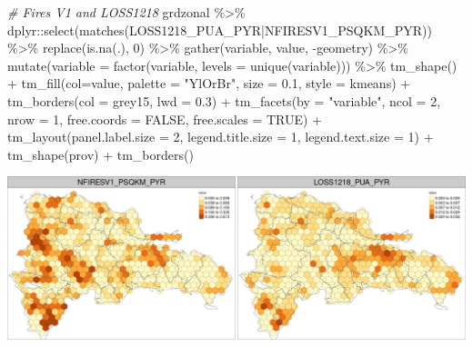 \documentclass[10pt,landscape,a3paper]{article}
\newenvironment{Shaded}{\begin{snugshade}}{\end{snugshade}}
\newcommand{\AttributeTok}[1]{\textcolor[rgb]{0.77,0.63,0.00}{#1}}
\newcommand{\CommentTok}[1]{\textcolor[rgb]{0.56,0.35,0.01}{\textit{#1}}}
\newcommand{\ConstantTok}[1]{\textcolor[rgb]{0.00,0.00,0.00}{#1}}
\newcommand{\DecValTok}[1]{\textcolor[rgb]{0.00,0.00,0.81}{#1}}
\newcommand{\FloatTok}[1]{\textcolor[rgb]{0.00,0.00,0.81}{#1}}
\newcommand{\FunctionTok}[1]{\textcolor[rgb]{0.00,0.00,0.00}{#1}}
\newcommand{\NormalTok}[1]{#1}
\newcommand{\SpecialCharTok}[1]{\textcolor[rgb]{0.00,0.00,0.00}{#1}}
\newcommand{\StringTok}[1]{\textcolor[rgb]{0.31,0.60,0.02}{#1}}
\begin{document}
\begin{Shaded}
\begin{Highlighting}[]

\CommentTok{\# Fires V1 and LOSS1218}
\NormalTok{grdzonal }\SpecialCharTok{\%\textgreater{}\%}\NormalTok{ dplyr}\SpecialCharTok{::}\FunctionTok{select}\NormalTok{(}\FunctionTok{matches}\NormalTok{(}\StringTok{\textquotesingle{}LOSS1218\_PUA\_PYR|NFIRESV1\_PSQKM\_PYR\textquotesingle{}}\NormalTok{)) }\SpecialCharTok{\%\textgreater{}\%} 
  \FunctionTok{replace}\NormalTok{(}\FunctionTok{is.na}\NormalTok{(.), }\DecValTok{0}\NormalTok{) }\SpecialCharTok{\%\textgreater{}\%} 
  \FunctionTok{gather}\NormalTok{(variable, value, }\SpecialCharTok{{-}}\NormalTok{geometry) }\SpecialCharTok{\%\textgreater{}\%}
  \FunctionTok{mutate}\NormalTok{(}\AttributeTok{variable =} \FunctionTok{factor}\NormalTok{(variable, }\AttributeTok{levels =} \FunctionTok{unique}\NormalTok{(variable))) }\SpecialCharTok{\%\textgreater{}\%} 
  \FunctionTok{tm\_shape}\NormalTok{() }\SpecialCharTok{+}
  \FunctionTok{tm\_fill}\NormalTok{(}\AttributeTok{col=}\StringTok{\textquotesingle{}value\textquotesingle{}}\NormalTok{, }\AttributeTok{palette =} \StringTok{"YlOrBr"}\NormalTok{, }\AttributeTok{size =} \FloatTok{0.1}\NormalTok{, }\AttributeTok{style =} \StringTok{\textquotesingle{}kmeans\textquotesingle{}}\NormalTok{) }\SpecialCharTok{+}
  \FunctionTok{tm\_borders}\NormalTok{(}\AttributeTok{col =} \StringTok{\textquotesingle{}grey15\textquotesingle{}}\NormalTok{, }\AttributeTok{lwd =} \FloatTok{0.3}\NormalTok{) }\SpecialCharTok{+}
  \FunctionTok{tm\_facets}\NormalTok{(}\AttributeTok{by =} \StringTok{"variable"}\NormalTok{, }\AttributeTok{ncol =} \DecValTok{2}\NormalTok{, }\AttributeTok{nrow =} \DecValTok{1}\NormalTok{, }\AttributeTok{free.coords =} \ConstantTok{FALSE}\NormalTok{, }\AttributeTok{free.scales =} \ConstantTok{TRUE}\NormalTok{) }\SpecialCharTok{+}
  \FunctionTok{tm\_layout}\NormalTok{(}\AttributeTok{panel.label.size =} \DecValTok{2}\NormalTok{, }\AttributeTok{legend.title.size =} \DecValTok{1}\NormalTok{, }\AttributeTok{legend.text.size =} \DecValTok{1}\NormalTok{) }\SpecialCharTok{+}
  \FunctionTok{tm\_shape}\NormalTok{(prov) }\SpecialCharTok{+} \FunctionTok{tm\_borders}\NormalTok{()}
\end{Highlighting}
\end{Shaded}

\begin{center}\includegraphics{img/data-download-preparation-eda/zonal-long-term-grid-14} \end{center}
\end{document}
